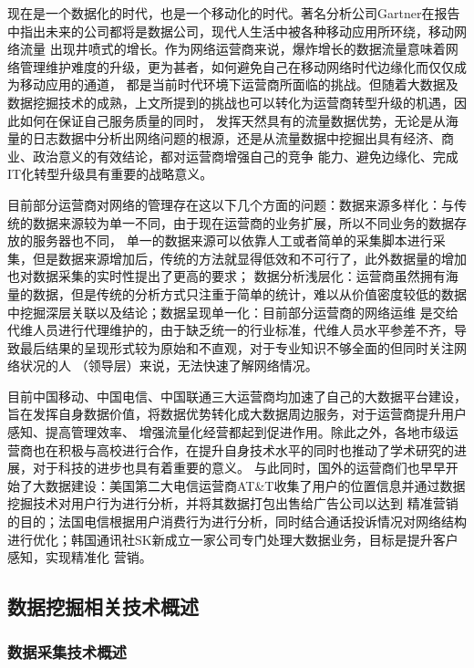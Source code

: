 \documentclass{HustGraduPaper}
\begin{document}
    现在是一个数据化的时代，也是一个移动化的时代。著名分析公司Gartner在报告中指出未来的公司都将是数据公司，现代人生活中被各种移动应用所环绕，移动网络流量
    出现井喷式的增长。作为网络运营商来说，爆炸增长的数据流量意味着网络管理维护难度的升级，更为甚者，如何避免自己在移动网络时代边缘化而仅仅成为移动应用的通道，
    都是当前时代环境下运营商所面临的挑战。但随着大数据及数据挖掘技术的成熟，上文所提到的挑战也可以转化为运营商转型升级的机遇，因此如何在保证自己服务质量的同时，
    发挥天然具有的流量数据优势，无论是从海量的日志数据中分析出网络问题的根源，还是从流量数据中挖掘出具有经济、商业、政治意义的有效结论，都对运营商增强自己的竞争
    能力、避免边缘化、完成IT化转型升级具有重要的战略意义。

    目前部分运营商对网络的管理存在这以下几个方面的问题：数据来源多样化：与传统的数据来源较为单一不同，由于现在运营商的业务扩展，所以不同业务的数据存放的服务器也不同，
    单一的数据来源可以依靠人工或者简单的采集脚本进行采集，但是数据来源增加后，传统的方法就显得低效和不可行了，此外数据量的增加也对数据采集的实时性提出了更高的要求；
    数据分析浅层化：运营商虽然拥有海量的数据，但是传统的分析方式只注重于简单的统计，难以从价值密度较低的数据中挖掘深层关联以及结论；数据呈现单一化：目前部分运营商的网络运维
    是交给代维人员进行代理维护的，由于缺乏统一的行业标准，代维人员水平参差不齐，导致最后结果的呈现形式较为原始和不直观，对于专业知识不够全面的但同时关注网络状况的人
    （领导层）来说，无法快速了解网络情况。

    目前中国移动、中国电信、中国联通三大运营商均加速了自己的大数据平台建设，旨在发挥自身数据价值，将数据优势转化成大数据周边服务，对于运营商提升用户感知、提高管理效率、
    增强流量化经营都起到促进作用。除此之外，各地市级运营商也在积极与高校进行合作，在提升自身技术水平的同时也推动了学术研究的进展，对于科技的进步也具有着重要的意义。
    与此同时，国外的运营商们也早早开始了大数据建设：美国第二大电信运营商AT\&T收集了用户的位置信息并通过数据挖掘技术对用户行为进行分析，并将其数据打包出售给广告公司以达到
    精准营销的目的；法国电信根据用户消费行为进行分析，同时结合通话投诉情况对网络结构进行优化；韩国通讯社SK新成立一家公司专门处理大数据业务，目标是提升客户感知，实现精准化
    营销。

    \subsection{数据挖掘相关技术概述}
    \subsubsection{数据采集技术概述}
    
\end{document}
